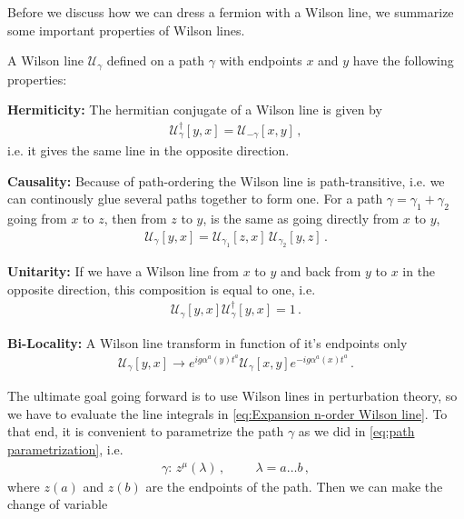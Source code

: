 Before we discuss how we can dress a fermion with a Wilson line, we summarize some important properties of Wilson lines.

\medskip
\begin{defbox*}{}{}
A Wilson line $\mathcal{U}_{\gamma}$ defined on a path $\gamma$ with endpoints $x$ and $y$ have the following properties:

\medskip
\textbf{Hermiticity:}
The hermitian conjugate of a Wilson line is given by
\begin{align}
    \mathcal{U}_{\gamma}^{\dagger}[y,x]=\mathcal{U}_{-\gamma}[x,y]\,,
\end{align}
i.e. it gives the same line in the opposite direction.

\medskip
\textbf{Causality:}
Because of path-ordering the Wilson line is path-transitive, i.e. we can continously glue several paths together to form one. For a path $\gamma=\gamma_1+\gamma_2$ going from $x$ to $z$, then from $z$ to $y$, is the same as going directly from $x$ to $y$,
\begin{align}
    \mathcal{U}_{\gamma}[y,x]=\mathcal{U}_{\gamma_1}[z,x]\,\mathcal{U}_{\gamma_2}[y,z]\,.
\end{align}

\medskip
\textbf{Unitarity:}
If we have a Wilson line from $x$ to $y$ and back from $y$ to $x$ in the opposite direction, this composition is equal to one, i.e.
\begin{align}
    \mathcal{U}_{\gamma}[y,x]\mathcal{U}_{\gamma}^{\dagger}[y,x]=1\,.
\end{align}

\medskip
\textbf{Bi-Locality:}
A Wilson line transform in function of it's endpoints only
\begin{align}
    \mathcal{U}_{\gamma}[y,x]\rightarrow e^{ig\alpha^{a}(y)t^{a}}\mathcal{U}_{\gamma}[x,y]e^{-ig\alpha^{a}(x)t^{a}}\,.
\end{align}
\end{defbox*}
The ultimate goal going forward is to use Wilson lines in perturbation theory, so we have to evaluate the line integrals in \cref{eq:Expansion n-order Wilson line}. To that end, it is convenient to parametrize the path $\gamma$ as we did in \cref{eq:path parametrization}, i.e.
\begin{align}
    \gamma:\,z^{\mu}(\lambda)\,,\hspace{1cm} \lambda=a\dots b\,,
\end{align}
where $z(a)$ and $z(b)$ are the endpoints of the path. Then we can make the change of variable
